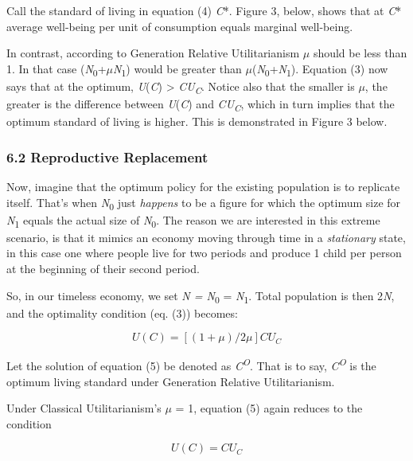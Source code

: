 \documentclass[man,11pt,a4paper,floatsintext]{apa7}
\begin{document}
\noindent Call the standard of living in equation (4) \textit{C}*. Figure 3, below, shows that at \textit{C}* average well-being per unit of consumption equals marginal well-being.

In contrast, according to Generation Relative Utilitarianism $\mu$ should be less than 1. In that case (\textit{N}\textsubscript{0}+$\mu$\textit{N}\textsubscript{1}) would be greater than $\mu$(\textit{N}\textsubscript{0}+\textit{N}\textsubscript{1}). Equation (3) now says that at the optimum, \textit{U}(\textit{C}) \textgreater{} \textit{CU}\textsubscript{\textit{C}}. Notice also that the smaller is $\mu$, the greater is the difference between \textit{U}(\textit{C}) and \textit{CU}\textsubscript{\textit{C}}, which in turn implies that the optimum standard of living is higher. This is demonstrated in Figure 3 below.

\subsubsection{6.2 Reproductive Replacement}

Now, imagine that the optimum policy for the existing population is to replicate itself. That's when \textit{N}\textsubscript{0} just \textit{happens} to be a figure for which the optimum size for \textit{N}\textsubscript{1} equals the actual size of \textit{N}\textsubscript{0}. The reason we are interested in this extreme scenario, is that it mimics an economy moving through time in a \textit{stationary} state, in this case one where people live for two periods and produce 1 child per person at the beginning of their second period.

So, in our timeless economy, we set \textit{N = N}\textsubscript{0} = \textit{N}\textsubscript{1}. Total population is then 2\textit{N}, and the optimality condition (eq. (3)) becomes:

\begin{equation}
U(C) = [(1+\mu)/2\mu]CU_C
\tag{5}
\end{equation}

\noindent Let the solution of equation (5) be denoted as \textit{C}\textsuperscript{\textit{O}}. That is to say, \textit{C}\textsuperscript{\textit{O}} is the optimum living standard under Generation Relative Utilitarianism.

Under Classical Utilitarianism's $\mu$ = 1, equation (5) again reduces to the condition

\begin{equation}
U(C) = CU_C
\tag{6}
\end{equation}
\end{document}
